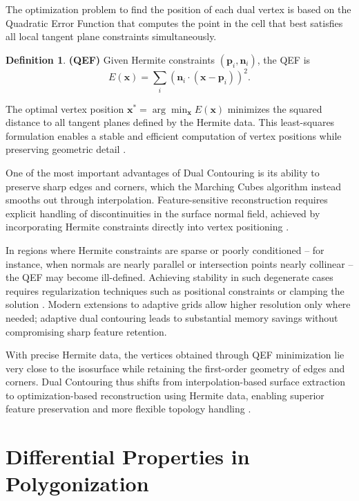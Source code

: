 \documentclass[12pt, a4paper, oneside]{book}
\theoremstyle{plain}
\theoremstyle{definition}
\newtheorem{definition}[theorem]{Definition}
\theoremstyle{remark}
\theoremstyle{definition}
\begin{document}
The optimization problem to find the position of each dual vertex is based on the Quadratic Error Function that computes the point in the cell that best satisfies all local tangent plane constraints simultaneously.

\begin{definition}
\textbf{(QEF)}
Given Hermite constraints $(\mathbf{p}_i, \mathbf{n}_i)$, the QEF is
\[
E(\mathbf{x}) = \sum_i \left( \mathbf{n}_i \cdot (\mathbf{x} - \mathbf{p}_i) \right)^2.
\]
\end{definition}

The optimal vertex position $\mathbf{x}^* = \arg\min_{\mathbf{x}} E(\mathbf{x})$ minimizes the squared distance to all tangent planes defined by the Hermite data. This least-squares formulation enables a stable and efficient computation of vertex positions while preserving geometric detail \cite{ju2002dual}.

One of the most important advantages of Dual Contouring is its ability to preserve sharp edges and corners, which the Marching Cubes algorithm instead smooths out through interpolation. Feature-sensitive reconstruction requires explicit handling of discontinuities in the surface normal field, achieved by incorporating Hermite constraints directly into vertex positioning \cite{kobbelt2001feature}.

In regions where Hermite constraints are sparse or poorly conditioned -- for instance, when normals are nearly parallel or intersection points nearly collinear -- the QEF may become ill-defined. Achieving stability in such degenerate cases requires regularization techniques such as positional constraints or clamping the solution \cite{ju2002dual}. Modern extensions to adaptive grids allow higher resolution only where needed; adaptive dual contouring leads to substantial memory savings without compromising sharp feature retention.

With precise Hermite data, the vertices obtained through QEF minimization lie very close to the isosurface while retaining the first-order geometry of edges and corners. Dual Contouring thus shifts from interpolation-based surface extraction to optimization-based reconstruction using Hermite data, enabling superior feature preservation and more flexible topology handling \cite{ju2002dual,kobbelt2001feature}.

\section{Differential Properties in Polygonization}

\newpage



\end{document}
